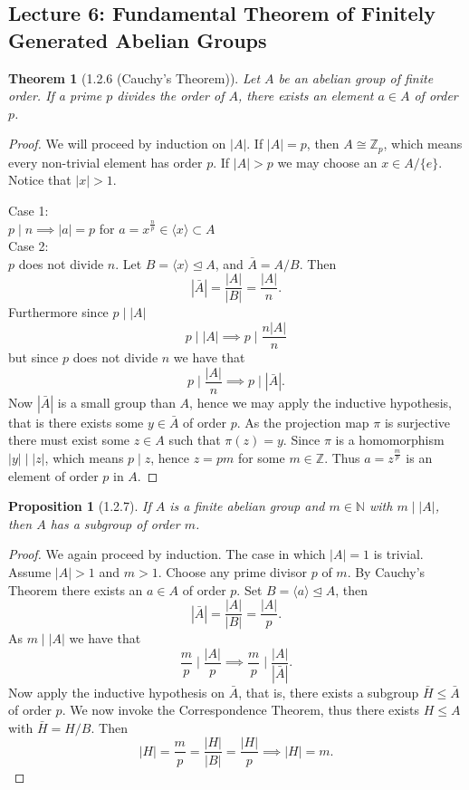 \documentclass[11pt,leqno,oneside]{amsart}
\newcommand{\N}{{\mathbb N}} %
\newcommand{\Z}{{\mathbb Z}} %
\newcommand{\normsubgroup}{\mathrel{\unlhd}}
\newcommand{\isom}{\mathrel{\cong}}
\newtheorem*{thm*}{Theorem}
\newtheorem*{prop*}{Proposition}
\theoremstyle{definition}
\numberwithin{equation}{section}
\begin{document}
\subsection*{Lecture 6: Fundamental
  Theorem of Finitely Generated Abelian
  Groups}

\begin{thm*}[1.2.6 (Cauchy's Theorem)]
  Let \(A\) be an abelian group of
  finite order. If a prime \(p\) divides
  the order of \(A\), there exists an
  element \(a \in A\) of order \(p\).
\end{thm*}

\begin{proof}
  We will proceed by induction on
  \(|A|\). If \(|A|=p\), then
  \(A \isom \Z_p\), which means every
  non-trivial element has order
  \(p\). If \(|A| > p\) we may choose an
  \(x \in A/\{e\}\). Notice that
  \(|x| > 1\).

  \noindent Case 1:\\
  \(p \mid n \implies |a|=p\) for
  \(a=x^{\frac{n}{p}} \in \langle x
  \rangle \subset A\)\\

  \noindent Case 2:\\ \(p\) does not
  divide \(n\). Let
  \(B=\langle x \rangle \normsubgroup
  A\), and \(\bar{A}=A /B\). Then
  \[|\bar{A}|=\frac{|A|}{|B|}=\frac{|A|}{n}.\]
  Furthermore since \(p \mid |A|\)
  \[p \mid |A| \implies p \mid
    \frac{n|A|}{n}\] but since \(p\)
  does not divide \(n\) we have that
  \[p \mid \frac{|A|}{n}\implies p \mid
    |\bar{A}|.\] Now \(|\bar{A}|\) is a
  small group than \(A\), hence we may
  apply the inductive hypothesis, that
  is there exists some \(y \in \bar{A}\)
  of order \(p\). As the projection map
  \(\pi\) is surjective there must exist
  some \(z \in A\) such that
  \(\pi(z)=y\). Since \(\pi\) is a
  homomorphism \(|y| \mid |z|\), which
  means \(p \mid z\), hence \(z=pm\) for
  some \(m \in \Z\). Thus
  \(a=z^{\frac{m}{p}}\) is an element of
  order \(p\) in \(A\).
\end{proof}

\begin{prop*}[1.2.7]
  If \(A\) is a finite abelian group and
  \(m \in \N\) with \(m \mid |A|\), then
  \(A\) has a subgroup of order \(m\).
\end{prop*}
\begin{proof}
  We again proceed by induction. The
  case in which \(|A|=1\) is
  trivial. Assume \(|A|>1\) and
  \(m>1\). Choose any prime divisor
  \(p\) of \(m\). By Cauchy's Theorem
  there exists an \(a \in A\) of order
  \(p\). Set
  \(B=\langle a\rangle \unlhd A\), then
  \[|\bar{A}|=\frac{|A|}{|B|}=\frac{|A|}{p}.\]
  As \(m \mid |A|\) we have that
  \[\frac{m}{p} \mid \frac{|A|}{p}
    \implies \frac{m}{p} \mid
    \frac{|A|}{|\bar{A}|}.\] Now apply
  the inductive hypothesis on
  \(\bar{A}\), that is, there exists a
  subgroup \(\bar{H} \le \bar{A}\) of
  order \(p\). We now invoke the
  Correspondence Theorem, thus there
  exists \(H \le A\) with
  \(\bar{H}=H/B\). Then
  \[|H|=\frac{m}{p}=\frac{|H|}{|B|}=\frac{|H|}{p}
    \implies |H|=m.\]
\end{proof}
\end{document}
